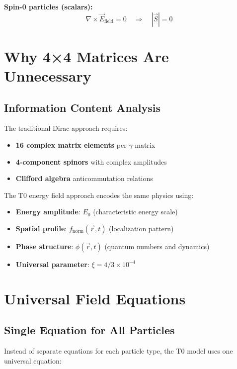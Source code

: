 \documentclass[12pt,a4paper]{report}
\begin{document}
\textbf{Spin-0 particles (scalars):}
\begin{equation}
	\nabla \times \vec{E}_{\text{field}} = 0 \quad \Rightarrow \quad |\vec{S}| = 0
\end{equation}

\section{Why 4×4 Matrices Are Unnecessary}
\label{sec:matrix_elimination_justification}

\subsection{Information Content Analysis}
\label{subsec:information_content}

The traditional Dirac approach requires:
\begin{itemize}
	\item \textbf{16 complex matrix elements} per $\gamma$-matrix
	\item \textbf{4-component spinors} with complex amplitudes
	\item \textbf{Clifford algebra} anticommutation relations
\end{itemize}

The T0 energy field approach encodes the same physics using:
\begin{itemize}
	\item \textbf{Energy amplitude}: $E_0$ (characteristic energy scale)
	\item \textbf{Spatial profile}: $f_{\text{norm}}(\vec{r}, t)$ (localization pattern)
	\item \textbf{Phase structure}: $\phi(\vec{r}, t)$ (quantum numbers and dynamics)
	\item \textbf{Universal parameter}: $\xi = 4/3 \times 10^{-4}$
\end{itemize}

\section{Universal Field Equations}
\label{sec:universal_equations}

\subsection{Single Equation for All Particles}
\label{subsec:single_equation}

Instead of separate equations for each particle type, the T0 model uses one universal equation:
\end{document}

